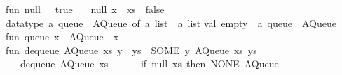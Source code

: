 \begin{isabellebody}
\begin{isamarkuptext}
fun\ null\ {}{}\ {}\ true\isanewline
\ \ {}\ null\ {}x\ {}{}\ xs{}\ {}\ false{}\isanewline
\isanewline
datatype\ {}a\ queue\ {}\ AQueue\ of\ {}a\ list\ {}\ {}a\ list{}\isanewline
\isanewline
val\ empty\ {}\ {}a\ queue\ {}\ AQueue\ {}{}{}{}\ {}{}{}{}\isanewline
\isanewline
fun\ queue\ x\ {}\ AQueue\ {}{}{}{}\ x{}{}\isanewline
\isanewline
fun\ dequeue\ {}AQueue\ {}xs{}\ y\ {}{}\ ys{}{}\ {}\ {}SOME\ y{}\ AQueue\ {}xs{}\ ys{}{}\isanewline
\ \ {}\ dequeue\ {}AQueue\ {}xs{}\ {}{}{}{}\ {}\isanewline
\ \ \ \ {}if\ null\ xs\ then\ {}NONE{}\ AQueue\ {}{}{}{}\ {}{}{}{}\isanewline

\end{isamarkuptext}
\end{isabellebody}
